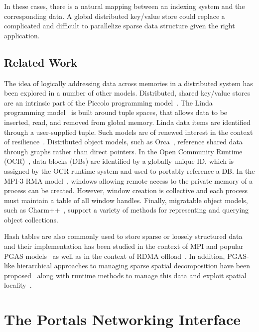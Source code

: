In these cases, there is a natural mapping between an indexing system
and the corresponding data. A global distributed key/value store could
replace a complicated and difficult to parallelize sparse data
structure given the right application.

\subsection{Related Work}

The idea of logically addressing data across memories in a distributed
system has been explored in a number of other models.  Distributed,
shared key/value stores are an intrinsic part of the Piccolo
programming model~\cite{power:10}.  The Linda programming
model~\cite{ahuja:86} is built around tuple spaces, that allows data
to be inserted, read, and removed from global memory. Linda data items
are identified through a user-supplied tuple.  Such models are of
renewed interest in the context of resilience~\cite{wilke:14}.
Distributed object models, such as Orca~\cite{bal:92}, reference
shared data through graphs rather than direct pointers.  In the Open
Community Runtime (OCR)~\cite{OCR}, data blocks (DBs) are identified
by a globally unique ID, which is assigned by the OCR runtime system
and used to portably reference a DB.
In the MPI-3 RMA model~\cite{mpi-forum:15}, windows allowing remote
access to the private memory of a process can be created.  However,
window creation is collective and each process must maintain a table of
all window handles.
Finally, migratable object
models, such as Charm++~\cite{kale:93}, support a variety of methods
for representing and querying object collections.

Hash tables are also commonly used to store sparse or loosely structured
data~\cite{memcached04,chord01,docan:12}
and their implementation has been studied in the context of MPI and popular PGAS
models~\cite{zht13,fompi13,cmpi10,maynard:12,memcached12,mht15} as well as in
the context of RDMA offload~\cite{memcached12,mitchell:13,kalia:14}.  In
addition, PGAS-like hierarchical approaches to
managing sparse spatial decomposition have been proposed~\cite{larkins:08}
along with runtime methods to manage this data and exploit spatial
locality~\cite{larkins:12}.

\section{The Portals Networking Interface}

